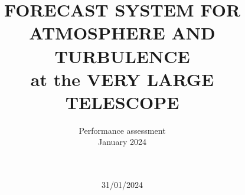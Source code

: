 \documentclass[a4paper,english]{article}
\title{FORECAST SYSTEM FOR ATMOSPHERE AND TURBULENCE\\
at the VERY LARGE TELESCOPE}
\author{
\vspace{1.0cm}
\begin{minipage}{9.5cm}
\begin{center}
\LARGE{Performance assessment}\\
\LARGE{January 2024}\\
\end{center}
\end{minipage}\\
\vspace{3cm}
}
\date{31/01/2024}
\begin{document}
\maketitle



\contents     %
\end{document}
